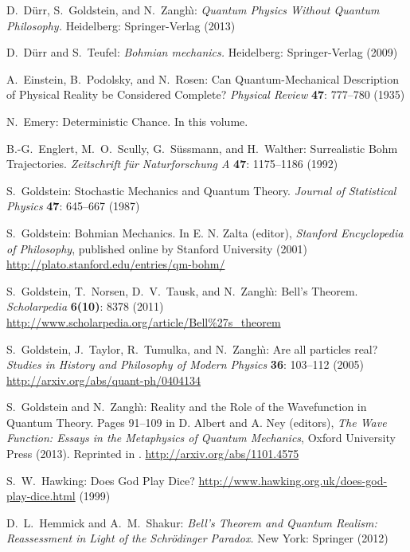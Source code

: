 \documentclass[12pt]{article}
\begin{document}
\begin{thebibliography}{20}
 D.~D\"urr, S.~Goldstein, and N.~Zangh\`\i: 
	\textit{Quantum Physics Without Quantum Philosophy.}
	Heidelberg: Springer-Verlag (2013)

 D.~D\"urr and S.~Teufel:
	{\it Bohmian mechanics.} 
	Heidelberg: Springer-Verlag (2009)

 A.~Einstein, B.~Podolsky, and N.~Rosen:
	Can Quantum-Mechanical Description of Physical Reality 
	be Considered Complete?
	\textit{Physical Review} \textbf{47}: 777--780 (1935)

 N.~Emery: Deterministic Chance.
	In this volume.

 B.-G.~Englert, M.~O.~Scully, G.~S\"ussmann, 
	and H.~Walther:
	Surrealistic Bohm Trajectories.
	{\it Zeitschrift f\"ur Naturforschung A} 
	{\bf 47}: 1175--1186 (1992)

 S.~Goldstein: 
	Stochastic Mechanics and Quantum Theory. 
	{\it Journal of Statistical Physics} 
	\textbf{47}: 645--667 (1987)  

 S.~Goldstein: 
	Bohmian Mechanics. 
	In E. N. Zalta (editor), 
	\textit{Stanford Encyclopedia of Philosophy}, 
	published online by Stanford University (2001)
	\url{http://plato.stanford.edu/entries/qm-bohm/}

 S.~Goldstein, T.~Norsen, D.~V.~Tausk, 
	and N.~Zangh\`\i: 
	Bell's Theorem. 
	\textit{Scholarpedia} \textbf{6(10)}: 8378 (2011)
	\url{http://www.scholarpedia.org/article/Bell%27s_theorem}

 S.~Goldstein, J.~Taylor, R.~Tumulka, 
	and N.~Zangh\`\i:
	Are all particles real?
	\textit{Studies in History and Philosophy of Modern Physics} 
	\textbf{36}: 103--112 (2005)
	\url{http://arxiv.org/abs/quant-ph/0404134}

 S.~Goldstein and N.~Zangh\`\i: 
	Reality and the Role of the Wavefunction in Quantum Theory.
	Pages 91--109 in D. Albert and A. Ney (editors), 
	{\it The Wave Function: Essays in the Metaphysics of Quantum Mechanics}, 
	Oxford University Press (2013).
	Reprinted in \cite{DGZ13}. 
	\url{http://arxiv.org/abs/1101.4575}

 S.~W.~Hawking:
	Does God Play Dice?
	\url{http://www.hawking.org.uk/does-god-play-dice.html} (1999)

 D.~L.~Hemmick and A.~M.~Shakur:
	{\it Bell's Theorem and Quantum Realism: Reassessment 
	in Light of the Schr\"odinger Paradox.}
	New York: Springer (2012)


\end{thebibliography}
\end{document}
